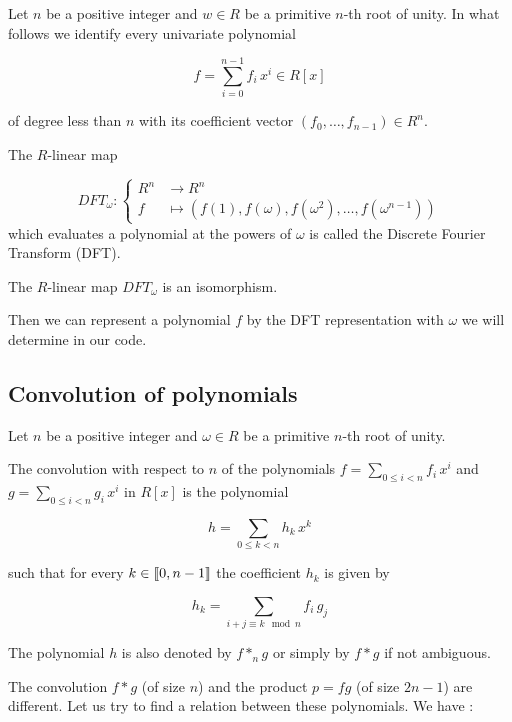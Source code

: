 Let $n$ be a positive integer and $w\in R$ be a primitive $n$-th root of unity. In what follows we identify every univariate polynomial

$$f = \sum_{i=0}^{n-1} f_i\,x^i \in R[x]$$

of degree less than $n$ with its coefficient vector $(f_0,\dots,f_{n-1}) \in R^n$.

\begin{definition*}
The $R$-linear map 

$$DFT_{\omega} : \begin{cases}
R^n &\rightarrow R^n \\
f &\mapsto (f(1), f(\omega), f(\omega^{2}),\dots,f(\omega^{n-1}))
\end{cases}$$
which evaluates a polynomial at the powers of $\omega$ is called the Discrete Fourier Transform (DFT).
\end{definition*}

\begin{proposition*}
The $R$-linear map $DFT_{\omega}$ is an isomorphism.
\end{proposition*}

Then we can represent a polynomial $f$ by the DFT representation with $\omega$ we will determine in our code.

\subsection{Convolution of polynomials}
Let $n$ be a positive integer and $\omega \in R$ be a primitive $n$-th root of unity.\\

\begin{definition}
The convolution with respect to $n$ of the polynomials $f = \sum_{0\leq i < n} f_i\,x^i$ and $g = \sum_{0\leq i < n} g_i\,x^i$ in $R[x]$ is the polynomial

$$h = \sum_{0\leq k < n}h_k\, x^k$$

such that for every $k \in \mbox{\textlbrackdbl} 0, n-1\mbox{\textrbrackdbl}$ the coefficient $h_k$ is given by

$$h_k = \sum_{i+j\equiv k \mod n}f_i\,g_j$$

The polynomial $h$ is also denoted by $f *_{n} g$ or simply by $f * g$ if not ambiguous.
\end{definition}

The convolution $f * g$ (of size $n$) and the product $p = fg$ (of size $2n-1$) are different. Let us try to find a relation between these polynomials. We have : \\

